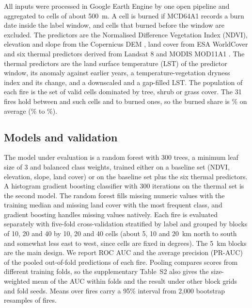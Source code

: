 \documentclass[preprint,12pt,authoryear]{elsarticle}
\begin{document}
All inputs were processed in Google Earth Engine \citep{Gorelick2017} by one open pipeline \citep{ThermalTwinRepo} and aggregated to cells of about 500~m. A cell is burned if MCD64A1 records a burn date inside the label window, and cells that burned before the window are excluded. The predictors are the Normalised Difference Vegetation Index (NDVI), elevation and slope from the Copernicus DEM \citep{CopernicusDEM}, land cover from ESA WorldCover \citep{Zanaga2022} and six thermal predictors derived from Landsat 8 \citep{LandsatC2L2} and MODIS MOD11A1 \citep{MOD11A1}. The thermal predictors are the land surface temperature (LST) of the predictor window, its anomaly against earlier years, a temperature-vegetation dryness index and its change, and a downscaled and a gap-filled LST. The population of each fire is the set of valid cells dominated by tree, shrub or grass cover. The 31 fires hold between \vcellsMin{} and \vcellsMax{} such cells and \vburnedMin{} to \vburnedMax{} burned ones, so the burned share is \vprevMean\% on average (\vprevMin\% to \vprevMax\%).

\subsection{Models and validation}
\label{sec:models}

The model under evaluation is a random forest \citep{Breiman2001} with 300 trees, a minimum leaf size of 3 and balanced class weights, trained either on a baseline set (NDVI, elevation, slope, land cover) or on the baseline set plus the six thermal predictors. A histogram gradient boosting classifier with 300 iterations on the thermal set is the second model. The random forest fills missing numeric values with the training median and missing land cover with the most frequent class, and gradient boosting handles missing values natively. Each fire is evaluated separately with five-fold cross-validation stratified by label and grouped by blocks of 10, 20 and 40 by 10, 20 and 40 cells (about 5, 10 and 20~km north to south and somewhat less east to west, since cells are fixed in degrees). The 5~km blocks are the main design. We report ROC AUC and the average precision (PR-AUC) of the pooled out-of-fold predictions of each fire. Pooling compares scores from different training folds, so the supplementary Table~S2 also gives the size-weighted mean of the AUC within folds and the result under other block grids and fold seeds. Means over fires carry a 95\% interval from 2,000 bootstrap resamples of fires.
\end{document}
